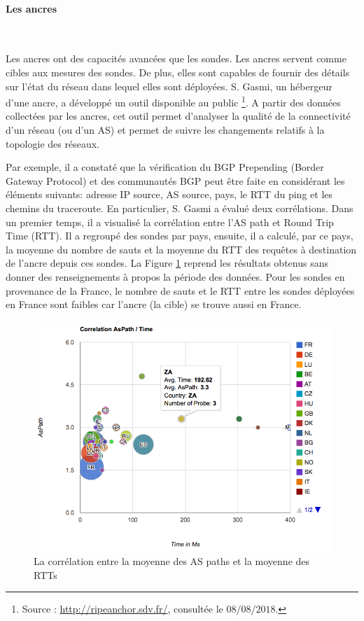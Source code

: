 \paragraph{Les ancres}~

Les ancres  ont des capacités avancées que les sondes. Les ancres servent comme cibles aux mesures des sondes. De plus, elles sont capables de fournir des détails sur l'état du réseau dans lequel elles sont déployées.  S. Gasmi, un hébergeur d'une ancre, a développé un outil  disponible au public \footnote{Source : \url{http://ripeanchor.sdv.fr/}, consultée le $08/08/2018$.}. 
A partir des données collectées par les ancres, cet outil permet d'analyser  la qualité de la connectivité d'un réseau (ou d'un AS) et permet de suivre les changements relatifs à la topologie des réseaux.

Par exemple, il a constaté que la vérification du BGP Prepending (Border Gateway Protocol) et des communautés BGP  peut être faite en  considérant les éléments suivants: adresse IP source, AS source, pays, le RTT du ping et les chemins du traceroute. En particulier, S. Gasmi a évalué deux corrélations. Dans un premier temps, il a visualisé la corrélation entre l'AS path et Round Trip Time (RTT). Il a regroupé des sondes par pays, ensuite, il a calculé, par ce pays, la moyenne du nombre de sauts et la moyenne du RTT des requêtes à destination de l'ancre depuis ces sondes.
La Figure \ref{fig:1-AS-Path-Time-correlationv} reprend les résultats obtenus sans donner des renseignements à propos la période des données. Pour les sondes en provenance de la France,  le nombre de sauts et le RTT entre les sondes déployées en France sont faibles car l'ancre (la cible) se trouve aussi en France.
\begin{figure}[h]
	\centering
	\captionsetup{justification=centering}
	\includegraphics[width=1\linewidth]{illustrations/1-AS-Path-Time-correlation}
	\caption{La corrélation entre la moyenne des AS paths et la moyenne des RTTs \cite{Salim-Gasmi}}
	\label{fig:1-AS-Path-Time-correlationv}
\end{figure}
